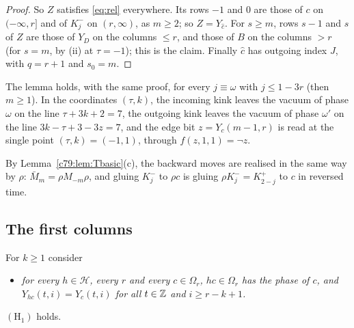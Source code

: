 \begin{proof}
So $Z$ satisfies \eqref{eq:rel} everywhere. Its rows $-1$ and $0$ are those of $c$ on $(-\infty,r]$ and of $K^-_j$ on $(r,\infty)$, as $m\ge2$; so $Z=Y_{\hat c}$. For $s\ge m$, rows $s-1$ and $s$ of $Z$ are those of $Y_D$ on the columns $\le r$, and those of $B$ on the columns $>r$ (for $s=m$, by (ii) at $\tau=-1$); this is the claim. Finally $\hat c$ has outgoing index $J$, with $q=r+1$ and $s_0=m$.
\end{proof}

The lemma holds, with the same proof, for every $j\equiv\omega$ with $j\le1-3r$ (then $m\ge1$). In the coordinates $(\tau,k)$, the incoming kink leaves the vacuum of phase $\omega$ on the line $\tau+3k+2=7$, the outgoing kink leaves the vacuum of phase $\omega'$ on the line $3k-\tau+3-3z=7$, and the edge bit $z=Y_c(m-1,r)$ is read at the single point $(\tau,k)=(-1,1)$, through $f(z,1,1)=\neg z$.

By Lemma~\ref{c79:lem:Tbasic}(c), the backward moves are realised in the same way by $\rho$: $\bar M_m=\rho M_{-m}\rho$, and gluing $K^-_j$ to $\rho c$ is gluing $\rho K^-_j=K^+_{2-j}$ to $c$ in reversed time.

\subsection{The first columns}\label{c79:sec:H}

For $k\ge1$ consider
\begin{itemize}
\item[$(\mathrm H_k)$] \emph{for every $h\in\mathcal H$, every $r$ and every $c\in\Omega_r$, $hc\in\Omega_r$ has the phase of $c$, and $Y_{hc}(t,i)=Y_c(t,i)$ for all $t\in\mathbb{Z}$ and $i\ge r-k+1$.}
\end{itemize}

\begin{proposition}[$(\mathrm H_1)$]\label{c79:prop:H1}
$(\mathrm H_1)$ holds.
\end{proposition}

